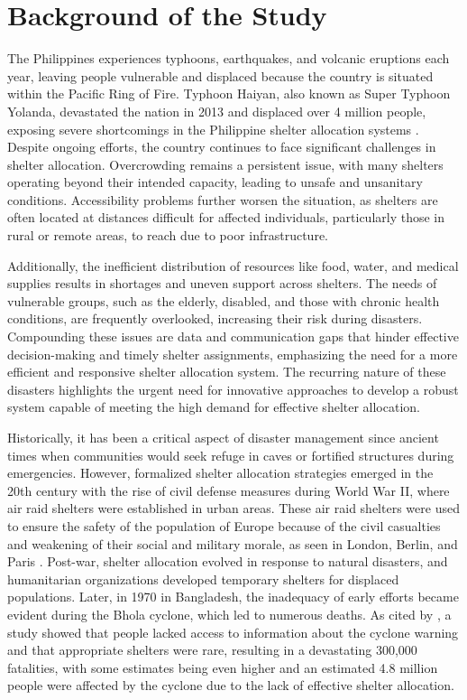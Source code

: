 \section{Background of the Study}

The Philippines experiences typhoons, earthquakes, and volcanic eruptions each year, leaving people vulnerable and displaced because the country is situated within the Pacific Ring of Fire. Typhoon Haiyan, also known as Super Typhoon Yolanda, devastated the nation in 2013 and displaced over 4 million people, exposing severe shortcomings in the Philippine shelter allocation systems \parencite{Iuchi2019}. Despite ongoing efforts, the country continues to face significant challenges in shelter allocation. Overcrowding remains a persistent issue, with many shelters operating beyond their intended capacity, leading to unsafe and unsanitary conditions. Accessibility problems further worsen the situation, as shelters are often located at distances difficult for affected individuals, particularly those in rural or remote areas, to reach due to poor infrastructure.

Additionally, the inefficient distribution of resources like food, water, and medical supplies results in shortages and uneven support across shelters. The needs of vulnerable groups, such as the elderly, disabled, and those with chronic health conditions, are frequently overlooked, increasing their risk during disasters. Compounding these issues are data and communication gaps that hinder effective decision-making and timely shelter assignments, emphasizing the need for a more efficient and responsive shelter allocation system. The recurring nature of these disasters highlights the urgent need for innovative approaches to develop a robust system capable of meeting the high demand for effective shelter allocation.

Historically, it has been a critical aspect of disaster management since ancient times when communities would seek refuge in caves or fortified structures during emergencies. However, formalized shelter allocation strategies emerged in the 20th century with the rise of civil defense measures during World War II, where air raid shelters were established in urban areas. These air raid shelters were used to ensure the safety of the population of Europe because of the civil casualties and weakening of their social and military morale, as seen in London, Berlin, and Paris \parencite{Flebus1941,Shakibamanesh2015}. Post-war, shelter allocation evolved in response to natural disasters, and humanitarian organizations developed temporary shelters for displaced populations. Later, in 1970 in Bangladesh, the inadequacy of early efforts became evident during the Bhola cyclone, which led to numerous deaths. As cited by \textcite{Hossain2018}, a study showed that people lacked access to information about the cyclone warning and that appropriate shelters were rare, resulting in a devastating 300,000 fatalities, with some estimates being even higher and an estimated 4.8 million people were affected by the cyclone due to the lack of effective shelter allocation.


